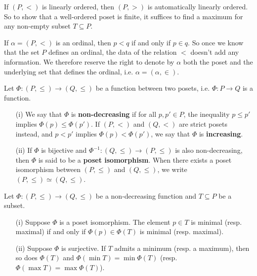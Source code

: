 \begin{remark}
    If $(P, <)$ is linearly ordered, then $(P, >)$ is automatically linearly ordered. So to show that a well-ordered poset is finite, it suffices to find a maximum for any non-empty subset $T \subseteq P$.
\end{remark}

\begin{remark}
    If $\alpha = (P,<)$ is an ordinal, then $p < q$ if and only if $p \in q$. So once we know that the set $P$ defines an ordinal, the data of the relation $<$ doesn't add any information. We therefore reserve the right to denote by $\alpha$ both the poset and the underlying set that defines the ordinal, i.e. $\alpha = (\alpha, \in)$.
\end{remark}


\begin{definition} \label{morphisms-of-posets}
    Let $\Phi : (P,\le) \to (Q,\le)$ be a function between two posets, i.e. $\Phi : P \to Q$ is a function. 
    \\

    \begin{itemize}
        \item[(i)] We say that $\Phi$ is \textbf{non-decreasing} if for all $p,p' \in P$, the inequality $p \le p'$ implies $\Phi(p) \le \Phi(p')$. If $(P,<)$ and $(Q,<)$ are strict posets instead, and $p < p'$ implies $\Phi(p) < \Phi(p')$, we say that $\Phi$ is \textbf{increasing}.
        \\

        \item[(ii)] If $\Phi$ is bijective and $\Phi^{-1} : (Q,\le) \to (P,\le)$ is also non-decreasing, then $\Phi$ is said to be a \textbf{poset isomorphism}. When there exists a poset isomorphism between $(P,\le)$ and $(Q,\le)$, we write $(P,\le) \simeq (Q,\le)$.
        \\

    \end{itemize}
\end{definition}

\begin{proposition} \label{extrema-under-poset-morphisms}
    Let $\Phi : (P,\le) \to (Q,\le)$ be a non-decreasing function and $T \subseteq P$ be a subset.
    \\

    \begin{itemize}
        \item[(i)] Suppose $\Phi$ is a poset isomorphism. The element $p \in T$ is minimal (resp. maximal) if and only if $\Phi(p) \in \Phi(T)$ is minimal (resp. maximal).
        \\

        \item[(ii)] Suppose $\Phi$ is surjective. If $T$ admits a minimum (resp. a maximum), then so does $\Phi(T)$ and $\Phi(\min T) = \min \Phi(T)$ (resp. $\Phi(\max T) = \max \Phi(T)$).
        \\

    \end{itemize}
\end{proposition}

